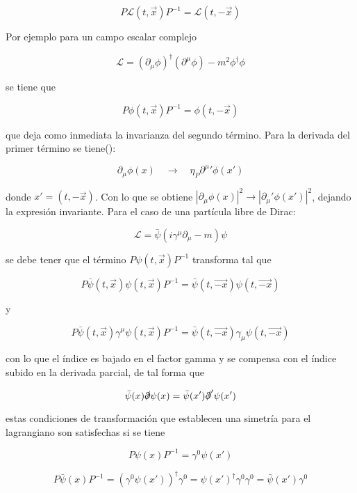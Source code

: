 $$ P\mathcal{L}(t, \vec{x})P^{-1} = \mathcal{L}(t, -\vec{x}) $$

Por ejemplo para un campo escalar complejo

$$ \mathcal{L} = (\partial_{\mu}\phi)^{\dagger}(\partial^{\mu}\phi) - m^2\phi^{\dagger}\phi $$

se tiene que

$$ P\phi(t, \vec{x})P^{-1} = \phi(t, -\vec{x}) $$

que deja como inmediata la invarianza del segundo término. Para la derivada del primer término se tiene(\cite{langacker2017standard}):

$$ \partial_{\mu}\phi(x) \quad \rightarrow \quad \eta_P \partial^{\mu}'\phi(x') $$

donde $x' = (t,-\vec{x})$. Con lo que se obtiene $|\partial_{\mu}\phi(x)|^2\rightarrow |\partial_{\mu}'\phi(x')|^2$, dejando la expresión invariante. Para el caso de una partícula libre de Dirac:

$$ \mathcal{L} = \bar{\psi}(i\gamma^{\mu}\partial_{\mu} - m)\psi $$

se debe tener que el término $P\psi(t,\vec{x})P^{-1}$ transforma tal que

$$ P\bar{\psi}(t,\vec{x})\psi(t,\vec{x})P^{-1} = \bar{\psi}(t,\vec{-x})\psi(t,\vec{-x}) $$

y 

$$ P\bar{\psi}(t,\vec{x})\gamma^{\mu} \psi(t,\vec{x})P^{-1} = \bar{\psi}(t,\vec{-x})\gamma_{\mu} \psi(t,\vec{-x}) $$

con lo que el índice es bajado en el factor gamma y se compensa con el índice subido en la derivada parcial, de tal forma que

$$ \bar{\psi}(x)\slashed{\partial}\psi(x) = \bar{\psi}(x')\slashed{\partial}'\psi(x') $$

estas condiciones de transformación que establecen una simetría para el lagrangiano son satisfechas si se tiene

$$ P\psi(x)P^{-1} = \gamma^0 \psi(x') $$

$$ P\bar{\psi}(x)P^{-1} = (\gamma^0 \psi(x'))^{\dagger}\gamma^0 = \psi(x')^{\dagger}\gamma^0 \gamma^0 = \bar{\psi}(x')\gamma^0 $$